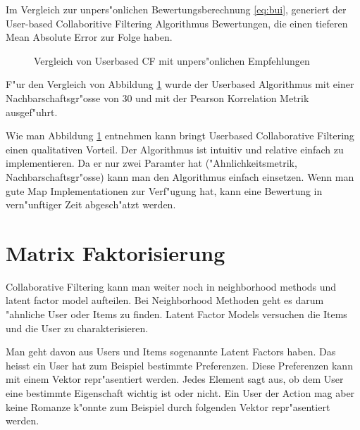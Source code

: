 \documentclass[a4paper, 12pt]{article}
\begin{document}
Im Vergleich zur unpers"onlichen Bewertungsberechnung \ref{eq:bui}, generiert der User-based Collaboritive Filtering Algorithmus Bewertungen, die einen tieferen Mean Absolute Error zur Folge haben.

\begin{figure}
  \centering
{}
\label{fig:uuvsbui}
\caption{Vergleich von Userbased CF mit unpers"onlichen Empfehlungen}
\end{figure}

F"ur den Vergleich von Abbildung \ref{fig:uuvsbui} wurde der Userbased Algorithmus mit einer Nachbarschaftsgr"osse von 30 und mit der Pearson Korrelation Metrik ausgef"uhrt. 

Wie man Abbildung \ref{fig:uuvsbui} entnehmen kann bringt Userbased Collaborative Filtering einen qualitativen Vorteil. Der Algorithmus ist intuitiv und relative einfach zu implementieren. Da er nur zwei Paramter hat ("Ahnlichkeitsmetrik, Nachbarschaftsgr"osse) kann man den Algorithmus einfach einsetzen. Wenn man gute Map Implementationen zur Verf"ugung hat, kann eine Bewertung in vern"unftiger Zeit abgesch"atzt werden.

\section{Matrix Faktorisierung}
\label{sec:matrixfactorization}

Collaborative Filtering kann man weiter noch in neighborhood methods und latent factor model aufteilen. Bei Neighborhood Methoden geht es darum "ahnliche User oder Items zu finden. Latent Factor Models versuchen die Items und die User zu charakterisieren. 

Man geht davon aus Users und Items sogenannte Latent Factors haben. Das heisst ein User hat zum Beispiel bestimmte Preferenzen. Diese Preferenzen kann mit einem Vektor repr"asentiert werden. Jedes Element sagt aus, ob dem User eine bestimmte Eigenschaft wichtig ist oder nicht. Ein User der Action mag aber keine Romanze k"onnte zum Beispiel durch folgenden Vektor repr"asentiert werden.
\end{document}
